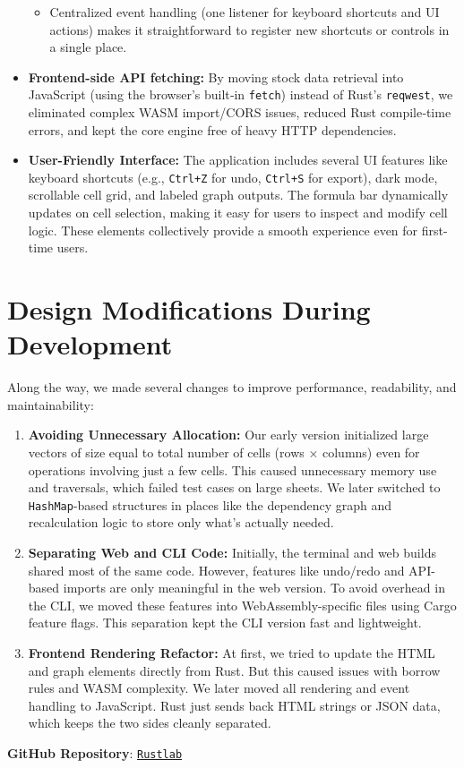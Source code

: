 \documentclass[12pt]{article}
\begin{document}
\begin{itemize}
\begin{itemize}
            \item Centralized event handling (one listener for keyboard shortcuts and UI actions) makes it straightforward to register new shortcuts or controls in a single place.
        \end{itemize}
        \item \textbf{Frontend-side API fetching:}
        By moving stock data retrieval into JavaScript (using the browser’s built‐in \texttt{fetch})
        instead of Rust’s \texttt{reqwest}, we eliminated complex WASM import/CORS issues, reduced Rust compile‐time errors, and kept the core engine free of heavy HTTP dependencies.
        \item \textbf{User-Friendly Interface:}
        The application includes several UI features like keyboard shortcuts (e.g., \texttt{Ctrl+Z} for undo, \texttt{Ctrl+S} for export), dark mode, scrollable cell grid, and labeled graph outputs. The formula bar dynamically updates on cell selection, making it easy for users to inspect and modify cell logic. These elements collectively provide a smooth experience even for first-time users.\\

    \end{itemize}

    \section{Design Modifications During Development}

    Along the way, we made several changes to improve performance, readability, and maintainability:

    \begin{enumerate}
        \item \textbf{Avoiding Unnecessary Allocation:}
        Our early version initialized large vectors of size equal to total number of cells (rows × columns) even for operations involving just a few cells. This caused unnecessary memory use and traversals, which failed test cases on large sheets. We later switched to \texttt{HashMap}-based structures in places like the dependency graph and recalculation logic to store only what’s actually needed.

        \item \textbf{Separating Web and CLI Code:}
        Initially, the terminal and web builds shared most of the same code. However, features like undo/redo and API-based imports are only meaningful in the web version. To avoid overhead in the CLI, we moved these features into WebAssembly-specific files using Cargo feature flags. This separation kept the CLI version fast and lightweight.

        \item \textbf{Frontend Rendering Refactor:}
        At first, we tried to update the HTML and graph elements directly from Rust. But this caused issues with borrow rules and WASM complexity. We later moved all rendering and event handling to JavaScript. Rust just sends back HTML strings or JSON data, which keeps the two sides cleanly separated. \\
    \end{enumerate}

    \large\noindent\textbf{GitHub Repository}: \href{https://github.com/mayankgoel2005/lab1_2023CS10204_2023CS10076_2023CS10186}{\texttt{Rustlab}}
\end{document}
